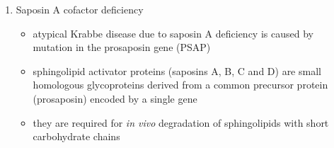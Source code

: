 \documentclass[12pt]{scrartcl}
\begin{document}
\begin{enumerate}
\item Saposin A cofactor deficiency
\label{sec:orgbd83cd5}
\begin{itemize}
\item atypical Krabbe disease due to saposin A deficiency is caused by mutation in the prosaposin gene (PSAP)
\item sphingolipid activator proteins (saposins A, B, C and D) are small
homologous glycoproteins derived from a common precursor protein
(prosaposin) encoded by a single gene
\item they are required for \emph{in vivo} degradation of sphingolipids with
short carbohydrate chains
\end{itemize}
\end{enumerate}
\end{document}
